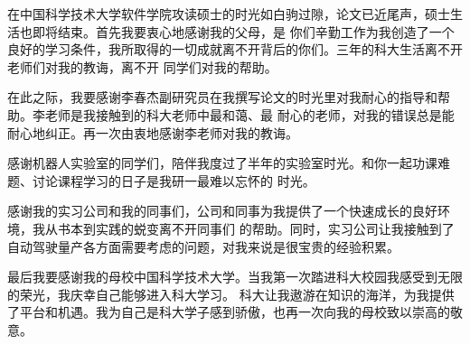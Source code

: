 
\begin{acknowledgements}
在中国科学技术大学软件学院攻读硕士的时光如白驹过隙，论文已近尾声，硕士生活也即将结束。首先我要衷心地感谢我的父母，是
你们辛勤工作为我创造了一个良好的学习条件，我所取得的一切成就离不开背后的你们。三年的科大生活离不开老师们对我的教诲，离不开
同学们对我的帮助。

在此之际，我要感谢李春杰副研究员在我撰写论文的时光里对我耐心的指导和帮助。李老师是我接触到的科大老师中最和蔼、最
耐心的老师，对我的错误总是能耐心地纠正。再一次由衷地感谢李老师对我的教诲。

感谢机器人实验室的同学们，陪伴我度过了半年的实验室时光。和你一起功课难题、讨论课程学习的日子是我研一最难以忘怀的
时光。

感谢我的实习公司和我的同事们，公司和同事为我提供了一个快速成长的良好环境，我从书本到实践的蜕变离不开同事们
的帮助。同时，实习公司让我接触到了自动驾驶量产各方面需要考虑的问题，对我来说是很宝贵的经验积累。

最后我要感谢我的母校中国科学技术大学。当我第一次踏进科大校园我感受到无限的荣光，我庆幸自己能够进入科大学习。
科大让我遨游在知识的海洋，为我提供了平台和机遇。我为自己是科大学子感到骄傲，也再一次向我的母校致以崇高的敬意。

\end{acknowledgements}
